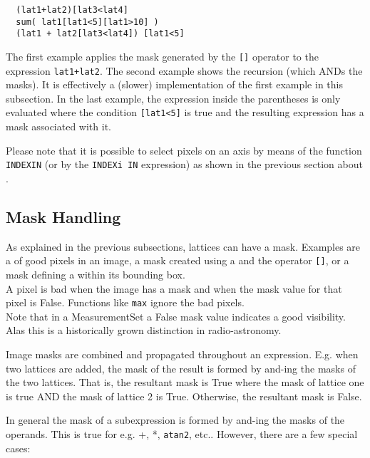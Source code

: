 \begin{verbatim}
  (lat1+lat2)[lat3<lat4]
  sum( lat1[lat1<5][lat1>10] )
  (lat1 + lat2[lat3<lat4]) [lat1<5]
\end{verbatim}
The first example applies the mask generated by the \texttt{[]}
operator to the expression \texttt{lat1+lat2}.  The second example shows
the recursion (which ANDs the masks).  It is effectively a (slower)
implementation of the first example in this subsection.  In the last
example, the expression inside the parentheses is only evaluated
where the condition {\tt [lat1<5]} is true and the resulting expression
has a mask associated with it.  

Please note that it is possible to select pixels on an axis by means
of the function \texttt{INDEXIN} (or by the \texttt{INDEXi IN}
expression) as shown in the previous section about
.


\subsection{\label{LEL:HANDMASKS}Mask Handling}

As explained in the previous subsections, lattices can have a mask. 
Examples are a  of good pixels in an image,
a mask created using a 
and the operator \texttt{[]},
or a mask defining a  within its bounding
box.
\\A pixel is bad when the image has a mask and when the
mask value for that pixel is False. Functions like
\texttt{max} ignore the bad pixels.
\\ Note that in a MeasurementSet a False mask value indicates a good
visibility. Alas this is a historically grown distinction in
radio-astronomy.

\medskip\noindent Image masks are combined and propagated throughout an
expression.  E.g.  when
two lattices are added, the mask of the result is formed by and-ing the
masks of the two lattices.   That is, the resultant mask is True where the
mask of lattice one is true AND the mask of lattice 2 is True. Otherwise,
the resultant mask is False.

\medskip\noindent In general the mask of a subexpression is formed by and-ing the masks
of the operands.  This is true for e.g.  +, *, \texttt{atan2}, etc.. 
However, there are a few special cases:


